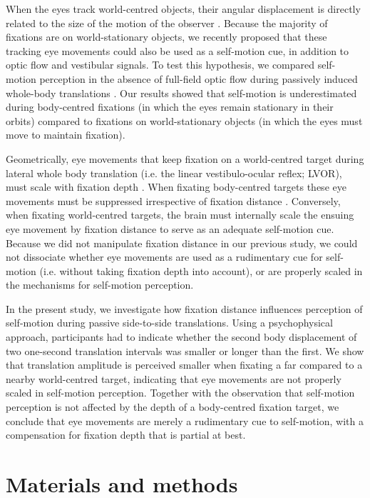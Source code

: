 When the eyes track world-centred objects, their angular displacement is directly related to the size of the motion of the observer \cite{schwarz1989, paige1998, mchenry2000, medendorp2002}. Because  the majority of fixations are on world-stationary  objects, we recently proposed that these tracking eye movements could also be used as a self-motion cue, in addition to optic flow and vestibular signals. To test this hypothesis, we compared self-motion perception in the absence of full-field optic flow during passively induced whole-body translations \cite{clemens2015a}. Our results showed that self-motion is underestimated during body-centred fixations (in which the eyes remain stationary in their orbits) compared to fixations on world-stationary objects (in which the eyes must move to maintain fixation).

Geometrically, eye movements that keep fixation on a world-centred target during lateral whole body translation (i.e. the linear vestibulo-ocular reflex; LVOR), must scale with fixation depth \cite{angelaki2004}. When fixating body-centred targets these eye movements must be suppressed irrespective of fixation distance \cite{angelaki2004}. Conversely, when fixating world-centred targets, the brain must internally scale the ensuing eye movement by fixation distance to serve as an adequate self-motion cue. Because we did not manipulate fixation distance in our previous study, we could not dissociate whether eye movements are used as a rudimentary cue for self-motion (i.e. without taking fixation depth into account), or are properly scaled in the mechanisms for self-motion perception.

In the present study, we investigate how fixation distance influences perception of self-motion during passive side-to-side translations. Using a psychophysical approach, participants had to indicate whether the second body displacement of two one-second translation intervals was smaller or longer than the first. We show that translation amplitude is perceived smaller when fixating a far compared to a nearby world-centred target, indicating that eye movements are not properly scaled in self-motion perception. Together with the observation that self-motion perception is not affected by the depth of a body-centred fixation target, we conclude that eye movements are merely a rudimentary cue to self-motion, with a compensation for fixation depth that is partial at best.




\section{Materials and methods}
\label{p4:sec:methods}

